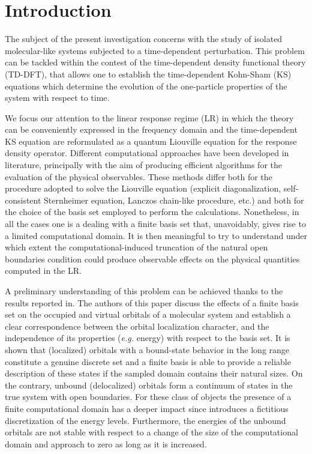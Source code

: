 \documentclass[reprint,aps,prb]{revtex4-1}
\begin{document}
\section{Introduction}

The subject of the present investigation concerns with the study of isolated molecular-like systems subjected to a time-dependent perturbation. %
This problem can be tackled within the contest of the time-dependent density functional theory (TD-DFT)\cite{runge1984,onida2002}, that allows one to establish the time-dependent 
Kohn-Sham (KS) equations which determine the evolution of the one-particle properties of the system with respect to time. 

We focus our attention to the linear response regime (LR) in which the theory can be conveniently expressed in the frequency domain and the time-dependent KS equation are reformulated 
as a quantum Liouville equation for the response density operator. Different computational approaches have been developed in literature\cite{baroni2008,hubener2014,brabec2015}, principally 
with the aim of producing efficient algorithms for the evaluation of the physical observables. These methods differ both for the procedure adopted to solve the Liouville equation 
(explicit diagonalization, self-consistent Sternheimer equation, Lanczos chain-like procedure, etc.) and both for the choice of the basis set employed to perform the calculations. 
Nonetheless, in all the cases one is a dealing with a finite basis set that, unavoidably, gives rise to a limited computational domain. It is then meaningful to try to understand under 
which extent the computational-induced truncation of the natural open boundaries condition could produce observable effects on the physical quantities computed in the LR. 

A preliminary understanding of this problem can be achieved thanks to the results reported in\cite{boffi2016}. The authors of this paper discuss the effects of a finite basis set on the 
occupied and virtual orbitals of a molecular system and establish a clear correspondence between the orbital localization character, and the independence of its properties (\emph{e.g.} energy) 
with respect to the basis set. It is shown that (localized) orbitals with a bound-state behavior in the long range constitute a genuine discrete set and a finite basis is 
able to provide a reliable description of these states if the sampled domain contains their natural sizes. On the contrary, unbound (delocalized) orbitals form a continuum of states in the 
true system with open boundaries. For these class of objects the presence of a finite computational domain has a deeper impact since introduces a fictitious discretization of the energy levels. 
Furthermore, the energies of the unbound orbitals are not stable with respect to a change of the size of the computational domain and approach to zero as long as it is increased.  
\end{document}
